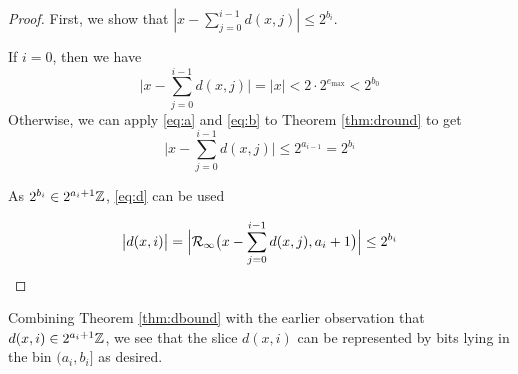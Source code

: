     \begin{proof}
      First, we show that $|x - \sum\limits_{j=0}^{i - 1}d(x,j)| \leq 2^{b_i}$.

      If $i = 0$, then we have
      \begin{equation*}
        \bigl|x - \sum\limits_{j=0}^{i - 1}d(x,j)\bigr| = |x| < 2 \cdot 2^{e_{\max}} < 2^{b_0}
      \end{equation*}
      Otherwise, we can apply  \eqref{eq:a} and \eqref{eq:b} to Theorem \ref{thm:dround} to get
      \begin{equation*}
        \bigl|x - \sum \limits_{j = 0}^{i - 1}d(x, j)\bigr| \leq 2^{a_{i - 1}} = 2^{b_i}
      \end{equation*}

      As $2^{b_i} \in 2^{a_i + 1}\mathbb{Z}$,  \eqref{eq:d} can be used

      \begin{equation*}
        \bigl|d(x, i)\bigr| = \Bigl|\mathcal{R}_\text{$\infty$}\bigl(x - \sum\limits_{j=0}^{i - 1}d(x,j), a_i + 1\bigr)\Bigr| \leq 2^{b_i}
      \end{equation*}
    \end{proof}

  Combining Theorem \ref{thm:dbound} with the earlier observation that $d(x,i) \in 2^{a_i + 1}\mathbb{Z}$, we see that the slice $d(x, i)$ can be represented by bits lying in the bin $(a_i, b_i]$ as desired.

